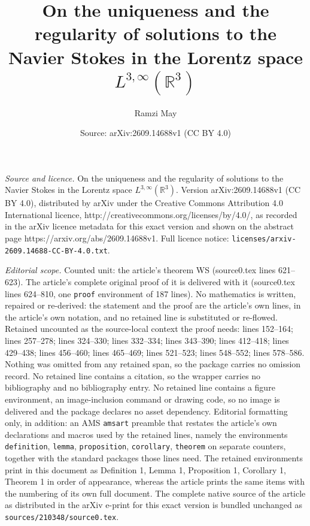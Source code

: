 \documentclass[10pt,a4paper]{amsart}
\title{On the uniqueness and the regularity of solutions to the Navier Stokes in the Lorentz space $L^{3,\infty}(\mathbb{R}^3)$}
\author{Ramzi May}
\date{Source: arXiv:2609.14688v1 (CC BY 4.0)}
\begin{document}
\maketitle

\noindent\emph{Source and licence.} On the uniqueness and the regularity of solutions to the Navier Stokes in the Lorentz space $L^{3,\infty}(\mathbb{R}^3)$. Version arXiv:2609.14688v1 (CC BY 4.0), distributed by arXiv under the Creative Commons Attribution 4.0 International licence, http://creativecommons.org/licenses/by/4.0/, as recorded in the arXiv licence metadata for this exact version and shown on the abstract page https://arxiv.org/abs/2609.14688v1. Full licence notice: \texttt{licenses/arxiv-2609.14688-CC-BY-4.0.txt}.\par\smallskip

\noindent\textit{Editorial scope.} Counted unit: the article's theorem WS (source0.tex lines 621--623). The article's complete original proof of it is delivered with it (source0.tex lines 624--810, one \texttt{proof} environment of 187 lines). No mathematics is written, repaired or re-derived: the statement and the proof are the article's own lines, in the article's own notation, and no retained line is substituted or re-flowed.  Retained uncounted as the source-local context the proof needs: lines 152--164; lines 257--278; lines 324--330; lines 332--334; lines 343--390; lines 412--418; lines 429--438; lines 456--460; lines 465--469; lines 521--523; lines 548--552; lines 578--586.  Nothing was omitted from any retained span, so the package carries no omission record.  No retained line contains a citation, so the wrapper carries no bibliography and no bibliography entry.  No retained line contains a figure environment, an image-inclusion command or drawing code, so no image is delivered and the package declares no asset dependency.  Editorial formatting only, in addition: an AMS \texttt{amsart} preamble that restates the article's own declarations and macros used by the retained lines, namely the environments \texttt{definition}, \texttt{lemma}, \texttt{proposition}, \texttt{corollary}, \texttt{theorem} on separate counters, together with the standard packages those lines need.  The retained environments print in this document as Definition 1, Lemma 1, Proposition 1, Corollary 1, Theorem 1 in order of appearance, whereas the article prints the same items with the numbering of its own full document.  The complete native source of the article as distributed in the arXiv e-print for this exact version is bundled unchanged as \texttt{sources/210348/source0.tex}.
\end{document}
